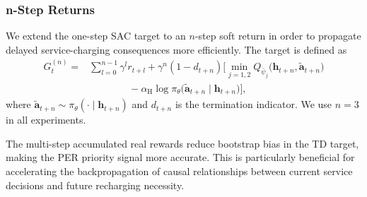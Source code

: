 \documentclass[journal]{IEEEtran}
\begin{document}
\subsubsection{n-Step Returns}
We extend the one-step SAC target to an \(n\)-step soft return in order to
propagate delayed service-charging consequences more efficiently. The target
is defined as
\begin{align}\label{eq:nstep}
G_t^{(n)}
={}&
\sum_{l=0}^{n-1}\gamma^l r_{t+l}
+\gamma^n(1-d_{t+n})
\Big[
\min_{j=1,2}
Q_{\bar{\psi}_j}
\bigl(\bm{h}_{t+n},\tilde{\bm{a}}_{t+n}\bigr)
\nonumber\\
&\qquad\qquad
-\alpha_{\mathrm{H}}
\log\pi_\theta
\bigl(
\tilde{\bm{a}}_{t+n}\mid\bm{h}_{t+n}
\bigr)
\Big],
\end{align}
where
$\tilde{\bm{a}}_{t+n}\sim
\pi_\theta(\cdot\mid\bm{h}_{t+n})$
and $d_{t+n}$ is the termination indicator. We use $n=3$ in all
experiments.

The multi-step accumulated real rewards reduce bootstrap bias in the
TD target, making the PER priority signal more accurate.
This is particularly beneficial for accelerating the backpropagation
of causal relationships between current service decisions
and future recharging necessity.


\end{document}

